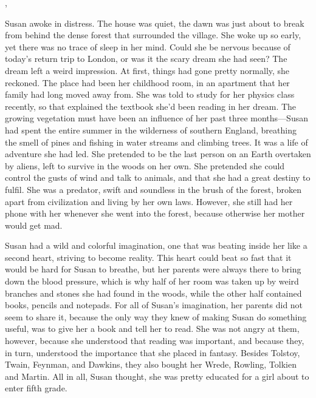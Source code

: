 \documentclass[openany, oneside]{book}
\begin{document}
\sep

Susan awoke in distress.
The house was quiet, the dawn was just about to break from behind the dense forest that surrounded the village.
She woke up so early, yet there was no trace of sleep in her mind.
Could she be nervous because of today's return trip to London, or was it the scary dream she had seen?
The dream left a weird impression.
At first, things had gone pretty normally, she reckoned.
The place had been her childhood room, in an apartment that her family had long moved away from.
She was told to study for her physics class recently, so that explained the textbook she'd been reading in her dream.
The growing vegetation must have been an influence of her past three months---Susan had spent the entire summer in the wilderness of southern England, breathing the smell of pines and fishing in water streams and climbing trees.
It was a life of adventure she had led.
She pretended to be the last person on an Earth overtaken by aliens, left to survive in the woods on her own.
She pretended she could control the gusts of wind and talk to animals, and that she had a great destiny to fulfil.
She was a predator, swift and soundless in the brush of the forest, broken apart from civilization and living by her own laws.
However, she still had her phone with her whenever she went into the forest, because otherwise her mother would get mad.

Susan had a wild and colorful imagination, one that was beating inside her like a second heart, striving to become reality.
This heart could beat so fast that it would be hard for Susan to breathe, but her parents were always there to bring down the blood pressure, which is why half of her room was taken up by weird branches and stones she had found in the woods, while the other half contained books, pencils and notepads.
For all of Susan's imagination, her parents did not seem to share it, because the only way they knew of making Susan do something useful, was to give her a book and tell her to read.
She was not angry at them, however, because she understood that reading was important, and because they, in turn, understood the importance that she placed in fantasy.
Besides Tolstoy, Twain, Feynman, and Dawkins, they also bought her Wrede, Rowling, Tolkien and Martin.
All in all, Susan thought, she was pretty educated for a girl about to enter fifth grade.
\end{document}
